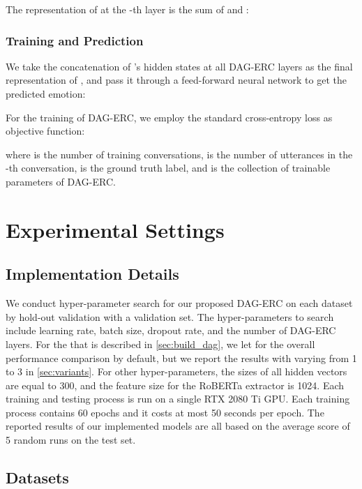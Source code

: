 \documentclass[11pt,a4paper]{article}
\begin{document}
The representation of  at the -th layer is the sum of  and :


\subsubsection{Training and Prediction}
We take the concatenation of 's hidden states at all DAG-ERC layers as the final representation of , and pass it through a feed-forward neural network to get the predicted emotion:


For the training of DAG-ERC, we employ the standard cross-entropy loss as objective function:

where  is the number of training conversations,  is the number of utterances in the -th conversation,  is the ground truth label, and  is the collection of trainable parameters of DAG-ERC. 

\section{Experimental Settings}
\subsection{Implementation Details}
We conduct hyper-parameter search for our proposed DAG-ERC on each dataset by hold-out validation with a validation set. The hyper-parameters to search include learning rate, batch size, dropout rate, and the number of DAG-ERC layers.
For the  that is described in \ref{sec:build_dag}, we let  for the overall performance comparison by default, but we report the results with  varying from 1 to 3 in \ref{sec:variants}.
For other hyper-parameters, the sizes of all hidden vectors are equal to 300, and the feature size for the RoBERTa extractor is 1024. 
Each training and testing process is run on a single RTX 2080 Ti GPU. Each training process contains 60 epochs and it costs at most 50 seconds per epoch. The reported results of our implemented models are all based on the average score of 5 random runs on the test set.
\subsection{Datasets}
\begin{table}[t]
	\centering
	\caption{The statistics of four datasets.}
	\label{tab:statistic}
\end{table}
\end{document}
